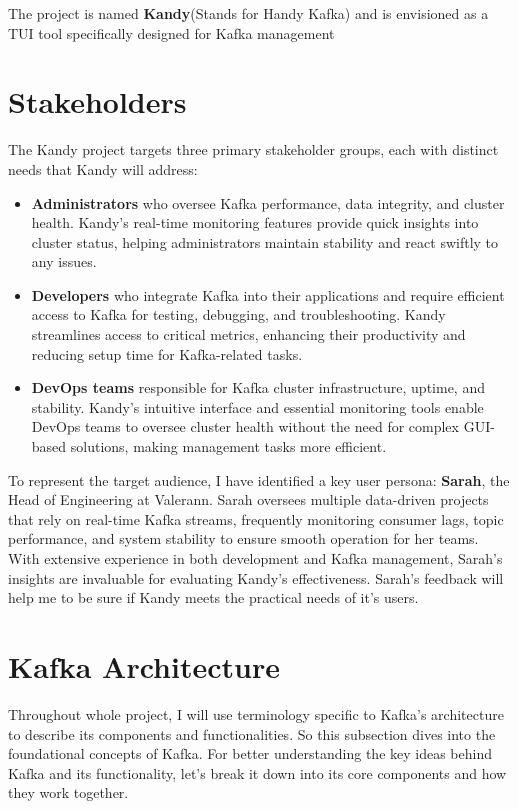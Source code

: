 \documentclass[10pt , a4paper]{report}
\begin{document}
The project is named \textbf{Kandy}(Stands for Handy Kafka) and is envisioned as a TUI tool specifically designed for Kafka management

\section{Stakeholders} 
The Kandy project targets three primary stakeholder groups, each with distinct needs that Kandy will address:

\begin{itemize} 
    \item \textbf{Administrators} who oversee Kafka performance, data integrity, and cluster health. Kandy’s real-time monitoring features provide quick insights into cluster status, helping administrators maintain stability and react swiftly to any issues.
    \item \textbf{Developers} who integrate Kafka into their applications and require efficient access to Kafka for testing, debugging, and troubleshooting. Kandy streamlines access to critical metrics, enhancing their productivity and reducing setup time for Kafka-related tasks.
    \item \textbf{DevOps teams} responsible for Kafka cluster infrastructure, uptime, and stability. Kandy’s intuitive interface and essential monitoring tools enable DevOps teams to oversee cluster health without the need for complex GUI-based solutions, making management tasks more efficient.
\end{itemize}

To represent the target audience, I have identified a key user persona: \textbf{Sarah}, the Head of Engineering at Valerann. Sarah oversees multiple data-driven projects that rely on real-time Kafka streams, frequently monitoring consumer lags, topic performance, and system stability to ensure smooth operation for her teams. With extensive experience in both development and Kafka management, Sarah’s insights are invaluable for evaluating Kandy’s effectiveness. Sarah’s feedback will help me to be sure if Kandy meets the practical needs of it's users.

\newpage

\section{Kafka Architecture}\label{Kafka_architecture}

Throughout whole project, I will use terminology specific to Kafka’s architecture to describe its components and functionalities. So
this subsection dives into the foundational concepts of Kafka. For better understanding the key ideas behind Kafka and its functionality, let’s break it down into its core components and how they work together.
\end{document}
